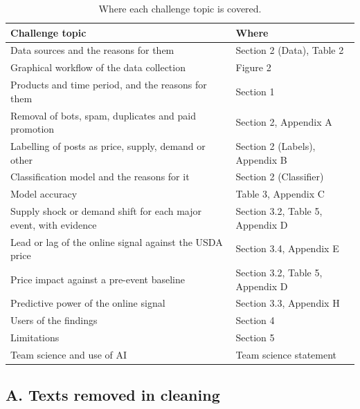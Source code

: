 \documentclass[
  11pt,
]{article}
\begin{document}
\begin{table}[htbp]
\centering\small
\caption{Where each challenge topic is covered.}
\begin{tabular}{ll}
\toprule
Challenge topic & Where \\
\midrule
Data sources and the reasons for them & Section 2 (Data), Table 2 \\
Graphical workflow of the data collection & Figure 2 \\
Products and time period, and the reasons for them & Section 1 \\
Removal of bots, spam, duplicates and paid promotion & Section 2, Appendix A \\
Labelling of posts as price, supply, demand or other & Section 2 (Labels), Appendix B \\
Classification model and the reasons for it & Section 2 (Classifier) \\
Model accuracy & Table 3, Appendix C \\
Supply shock or demand shift for each major event, with evidence & Section 3.2, Table 5, Appendix D \\
Lead or lag of the online signal against the USDA price & Section 3.4, Appendix E \\
Price impact against a pre-event baseline & Section 3.2, Table 5, Appendix D \\
Predictive power of the online signal & Section 3.3, Appendix H \\
Users of the findings & Section 4 \\
Limitations & Section 5 \\
Team science and use of AI & Team science statement \\
\bottomrule
\end{tabular}
\end{table}

\subsection{A. Texts removed in
cleaning}\label{a.-texts-removed-in-cleaning}
\end{document}
